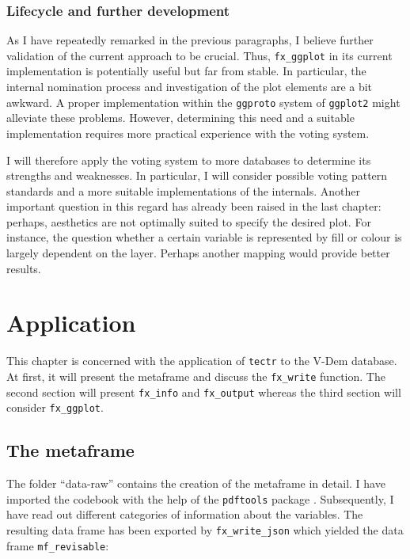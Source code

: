 \documentclass[]{report}
\theoremstyle{definition}
\theoremstyle{definition}
\theoremstyle{definition}
\theoremstyle{remark}
\begin{document}
\subsection{Lifecycle and further
development}\label{lifecycle-and-further-development}

As I have repeatedly remarked in the previous paragraphs, I believe
further validation of the current approach to be crucial. Thus,
\texttt{fx\_ggplot} in its current implementation is potentially useful
but far from stable. In particular, the internal nomination process and
investigation of the plot elements are a bit awkward. A proper
implementation within the \texttt{ggproto} system of \texttt{ggplot2}
might alleviate these problems. However, determining this need and a
suitable implementation requires more practical experience with the
voting system.

I will therefore apply the voting system to more databases to determine
its strengths and weaknesses. In particular, I will consider possible
voting pattern standards and a more suitable implementations of the
internals. Another important question in this regard has already been
raised in the last chapter: perhaps, aesthetics are not optimally suited
to specify the desired plot. For instance, the question whether a
certain variable is represented by fill or colour is largely dependent
on the layer. Perhaps another mapping would provide better results.

\hypertarget{application}{\chapter{Application}\label{application}}

This chapter is concerned with the application of \texttt{tectr} to the
V-Dem database. At first, it will present the metaframe and discuss the
\texttt{fx\_write} function. The second section will present
\texttt{fx\_info} and \texttt{fx\_output} whereas the third section will
consider \texttt{fx\_ggplot}.

\section{The metaframe}\label{the-metaframe-1}

The folder ``data-raw'' contains the creation of the metaframe in
detail. I have imported the codebook \citep{vdem-codebook2018} with the
help of the \texttt{pdftools} package \citep{pdftools}. Subsequently, I
have read out different categories of information about the variables.
The resulting data frame has been exported by \texttt{fx\_write\_json}
which yielded the data frame \texttt{mf\_revisable}:
\end{document}
